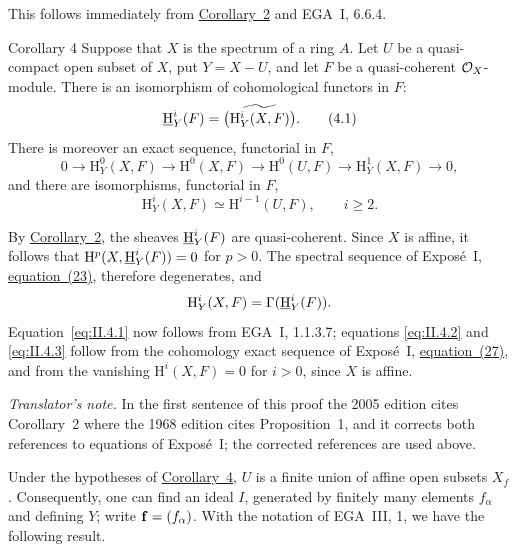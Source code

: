 This follows immediately from \hyperref[II.2]{Corollary~2} and EGA~I, 6.6.4.

\begin{sgastatement}{Corollary 4}
Suppose that $X$ is the spectrum of a ring $A$. Let $U$ be a
quasi-compact open subset of $X$, put $Y=X-U$, and let $F$ be a
quasi-coherent $\mathcal O_X$-module. There is an isomorphism of cohomological
functors in $F$:
\begin{equation}
  \mathop{\underline{\mathrm H}}\nolimits_Y^i(F)=\widetilde{\bigl(\mathrm H_Y^i(X,F)\bigr)}.
  \tag{4.1}\label{eq:II.4.1}
\end{equation}
There is moreover an exact sequence, functorial in $F$,
\begin{equation}
  0\longrightarrow \mathrm H_Y^0(X,F)
  \longrightarrow \mathrm H^0(X,F)
  \longrightarrow \mathrm H^0(U,F)
  \longrightarrow \mathrm H_Y^1(X,F)
  \longrightarrow 0,
  \tag{4.2}\label{eq:II.4.2}
\end{equation}
and there are isomorphisms, functorial in $F$,
\begin{equation}
  \mathrm H_Y^i(X,F)\simeq \mathrm H^{i-1}(U,F),
  \qquad i\geq 2.
  \tag{4.3}\label{eq:II.4.3}
\end{equation}
\end{sgastatement}

By \hyperref[II.2]{Corollary~2}, the sheaves $\mathop{\underline{\mathrm H}}\nolimits_Y^i(F)$ are quasi-coherent. Since $X$ is
affine, it follows that
$\mathrm H^p(X,\mathop{\underline{\mathrm H}}\nolimits_Y^i(F))=0$ for $p>0$. The spectral sequence of
Expos\'e~I, \hyperref[eq:I.23]{equation~(23)}, therefore degenerates, and
\[
  \mathrm H_Y^i(X,F)=\Gamma(\mathop{\underline{\mathrm H}}\nolimits_Y^i(F)).
\]
Equation~\eqref{eq:II.4.1} now follows from EGA~I, 1.1.3.7; equations
\eqref{eq:II.4.2} and \eqref{eq:II.4.3} follow from the cohomology exact
sequence of Expos\'e~I, \hyperref[eq:I.27]{equation~(27)}, and from the vanishing
$\mathrm H^i(X,F)=0$ for $i>0$, since $X$ is affine.

\noindent\textit{Translator's note.} In the first sentence of this proof the
2005 edition cites Corollary~2 where the 1968 edition cites Proposition~1,
and it corrects both references to equations of Expos\'e~I; the corrected
references are used above.

Under the hypotheses of \hyperref[II.4]{Corollary~4}, $U$ is a finite union of affine open subsets $X_f$.
Consequently, one can find an ideal $I$, generated by finitely many elements
$f_\alpha$ and defining $Y$; write $\mathbf f=(f_\alpha)$. With the notation of
EGA~III, 1, we have the
following result.

